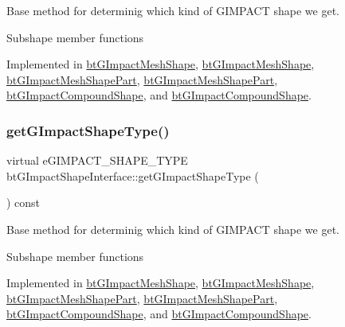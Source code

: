 Base method for determinig which kind of G\+I\+M\+P\+A\+CT shape we get. 

Subshape member functions 

Implemented in \hyperlink{classbtGImpactMeshShape_ac48641f3b35339f6de0716197bbbe302}{bt\+G\+Impact\+Mesh\+Shape}, \hyperlink{classbtGImpactMeshShape_ac48641f3b35339f6de0716197bbbe302}{bt\+G\+Impact\+Mesh\+Shape}, \hyperlink{classbtGImpactMeshShapePart_a89fb18e93d2f4078576b6789e59891a2}{bt\+G\+Impact\+Mesh\+Shape\+Part}, \hyperlink{classbtGImpactMeshShapePart_a89fb18e93d2f4078576b6789e59891a2}{bt\+G\+Impact\+Mesh\+Shape\+Part}, \hyperlink{classbtGImpactCompoundShape_a6f75f32671f5555df85d4efd342c1c67}{bt\+G\+Impact\+Compound\+Shape}, and \hyperlink{classbtGImpactCompoundShape_a6f75f32671f5555df85d4efd342c1c67}{bt\+G\+Impact\+Compound\+Shape}.

\mbox{\label{classbtGImpactShapeInterface_a25cacbe448997e3f8ec99cb2d4952859}} 
\subsubsection{\texorpdfstring{get\+G\+Impact\+Shape\+Type()}{getGImpactShapeType()}\hspace{0.1cm}{\footnotesize\ttfamily [2/2]}}
{\footnotesize\ttfamily virtual e\+G\+I\+M\+P\+A\+C\+T\+\_\+\+S\+H\+A\+P\+E\+\_\+\+T\+Y\+PE bt\+G\+Impact\+Shape\+Interface\+::get\+G\+Impact\+Shape\+Type (\begin{DoxyParamCaption}{ }\end{DoxyParamCaption}) const\hspace{0.3cm}{\ttfamily [pure virtual]}}



Base method for determinig which kind of G\+I\+M\+P\+A\+CT shape we get. 

Subshape member functions 

Implemented in \hyperlink{classbtGImpactMeshShape_ac48641f3b35339f6de0716197bbbe302}{bt\+G\+Impact\+Mesh\+Shape}, \hyperlink{classbtGImpactMeshShape_ac48641f3b35339f6de0716197bbbe302}{bt\+G\+Impact\+Mesh\+Shape}, \hyperlink{classbtGImpactMeshShapePart_a89fb18e93d2f4078576b6789e59891a2}{bt\+G\+Impact\+Mesh\+Shape\+Part}, \hyperlink{classbtGImpactMeshShapePart_a89fb18e93d2f4078576b6789e59891a2}{bt\+G\+Impact\+Mesh\+Shape\+Part}, \hyperlink{classbtGImpactCompoundShape_a6f75f32671f5555df85d4efd342c1c67}{bt\+G\+Impact\+Compound\+Shape}, and \hyperlink{classbtGImpactCompoundShape_a6f75f32671f5555df85d4efd342c1c67}{bt\+G\+Impact\+Compound\+Shape}.

